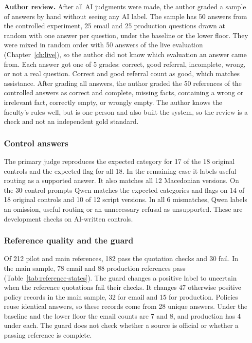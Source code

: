 \textbf{Author review.} After all AI judgments were made, the author graded a sample of answers by hand without seeing any AI label. The sample has 50 answers from the controlled experiment, 25 email and 25 production questions drawn at random with one answer per question, under the baseline or the lower floor. They were mixed in random order with 50 answers of the live evaluation (Chapter~\ref{ch:live}), so the author did not know which evaluation an answer came from. Each answer got one of 5 grades: correct, good referral, incomplete, wrong, or not a real question. Correct and good referral count as good, which matches assistance. After grading all answers, the author graded the 50 references of the controlled answers as correct and complete, missing facts, containing a wrong or irrelevant fact, correctly empty, or wrongly empty. The author knows the faculty's rules well, but is one person and also built the system, so the review is a check and not an independent gold standard.

\subsubsection{Control answers}

The primary judge reproduces the expected category for 17 of the 18 original controls and the expected flag for all 18. In the remaining case it labels useful routing as a supported answer. It also matches all 12 Macedonian versions. On the 30 control prompts Qwen matches the expected categories and flags on 14 of 18 original controls and 10 of 12 script versions. In all 6 mismatches, Qwen labels an omission, useful routing or an unnecessary refusal as unsupported. These are development checks on AI-written controls.

\subsubsection{Reference quality and the guard}
\label{sec:reference-quality}

Of 212 pilot and main references, 182 pass the quotation checks and 30 fail. In the main sample, 78 email and 88 production references pass (Table~\ref{tab:reference-states}). The guard changes a positive label to uncertain when the reference quotations fail their checks. It changes 47 otherwise positive policy records in the main sample, 32 for email and 15 for production. Policies reuse identical answers, so these records come from 28 unique answers. Under the baseline and the lower floor the email counts are 7 and 8, and production has 4 under each. The guard does not check whether a source is official or whether a passing reference is complete.

